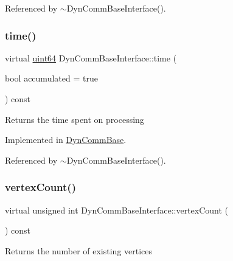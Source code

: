 Referenced by $\sim$\+Dyn\+Comm\+Base\+Interface().

\mbox{\label{classDynCommBaseInterface_a6fb483ffc71baf6f0d4f6a0371e34ca9}} 
\subsubsection{\texorpdfstring{time()}{time()}}
{\footnotesize\ttfamily virtual \hyperlink{systemDefines_8h_abc0f5bc07737e498f287334775dff2b6}{uint64} Dyn\+Comm\+Base\+Interface\+::time (\begin{DoxyParamCaption}\item[{bool}]{accumulated = {\ttfamily true} }\end{DoxyParamCaption}) const\hspace{0.3cm}{\ttfamily [pure virtual]}}

\begin{DoxyReturn}{Returns}
the time spent on processing 
\end{DoxyReturn}


Implemented in \hyperlink{classDynCommBase_a5b40eb14cef877fde1db8b6476f6a2ce}{Dyn\+Comm\+Base}.



Referenced by $\sim$\+Dyn\+Comm\+Base\+Interface().

\mbox{\label{classDynCommBaseInterface_a792b9c74e55abbc48fbc078bc5fead0c}} 
\subsubsection{\texorpdfstring{vertex\+Count()}{vertexCount()}}
{\footnotesize\ttfamily virtual unsigned int Dyn\+Comm\+Base\+Interface\+::vertex\+Count (\begin{DoxyParamCaption}{ }\end{DoxyParamCaption}) const\hspace{0.3cm}{\ttfamily [pure virtual]}}

\begin{DoxyReturn}{Returns}
the number of existing vertices 
\end{DoxyReturn}


